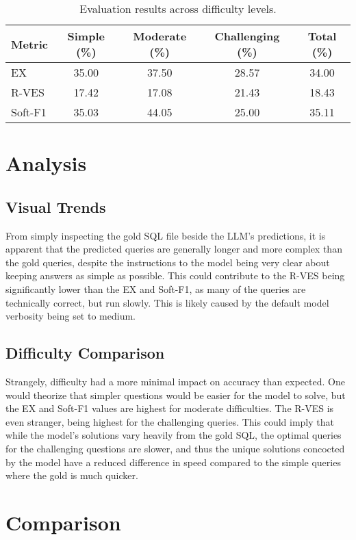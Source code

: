 \documentclass[11pt]{article}
\begin{document}
\begin{table}[h!]
\centering
\caption{Evaluation results across difficulty levels.}
\begin{tabular}{lcccc}
\hline
\textbf{Metric} & \textbf{Simple (\%)} & \textbf{Moderate (\%)} & \textbf{Challenging (\%)} & \textbf{Total (\%)} \\
\hline
EX      & 35.00 & 37.50 & 28.57 & 34.00 \\
R-VES   & 17.42 & 17.08 & 21.43 & 18.43 \\
Soft-F1 & 35.03 & 44.05 & 25.00 & 35.11 \\
\hline
\end{tabular}
\end{table}


\section{Analysis}
\subsection{Visual Trends}
From simply inspecting the gold SQL file beside the LLM's predictions, it is apparent that the predicted queries are generally longer and more complex than the gold queries, despite the instructions to the model being very clear about keeping answers as simple as possible. This could contribute to the R-VES being significantly lower than the EX and Soft-F1, as many of the queries are technically correct, but run slowly. This is likely caused by the default model verbosity being set to medium. 

\subsection{Difficulty Comparison}
Strangely, difficulty had a more minimal impact on accuracy than expected. One would theorize that simpler questions would be easier for the model to solve, but the EX and Soft-F1 values are highest for moderate difficulties. The R-VES is even stranger, being highest for the challenging queries. This could imply that while the model's solutions vary heavily from the gold SQL,  the optimal queries for the challenging questions are slower, and thus the unique solutions concocted by the model have a reduced difference in speed compared to the simple queries where the gold is much quicker. 

\section{Comparison}
\end{document}
